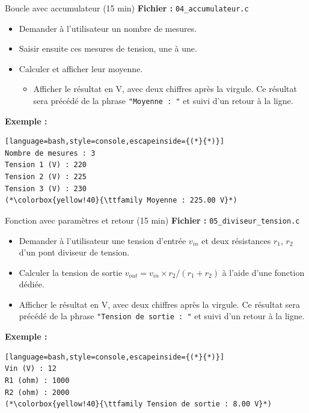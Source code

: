 \begin{UPSTIexercice}{Boucle avec accumulateur (15 min)}
  \textbf{Fichier :} \texttt{04\_accumulateur.c}
  \begin{itemize}
    \item Demander à l'utilisateur un nombre de mesures.
    \item Saisir ensuite ces mesures de tension, une à une.
    \item Calculer et afficher leur moyenne.
    \begin{itemize}
      \item Afficher le résultat en V, avec deux chiffres après la virgule. Ce résultat sera précédé de la phrase \texttt{"Moyenne : "} et suivi d'un retour à la ligne.
    \end{itemize}
  \end{itemize}

  \textbf{Exemple :}
  \begin{lstlisting}[language=bash,style=console,escapeinside={(*}{*)}]
Nombre de mesures : 3
Tension 1 (V) : 220
Tension 2 (V) : 225
Tension 3 (V) : 230
(*\colorbox{yellow!40}{\ttfamily Moyenne : 225.00 V}*)
  \end{lstlisting}
\end{UPSTIexercice}

\begin{UPSTIexercice}{Fonction avec paramètres et retour (15 min)}
  \textbf{Fichier :} \texttt{05\_diviseur\_tension.c}
  \begin{itemize}
    \item Demander à l'utilisateur une tension d'entrée $v_{in}$ et deux résistances $r_1$, $r_2$ d'un pont diviseur de tension.
    \item Calculer la tension de sortie $v_{out} = v_{in} \times r_2 / (r_1 + r_2)$ à l'aide d'une fonction dédiée.
    \item Afficher le résultat en V, avec deux chiffres après la virgule. Ce résultat sera précédé de la phrase \texttt{"Tension de sortie : "} et suivi d'un retour à la ligne.
  \end{itemize}

  \textbf{Exemple :}
  \begin{lstlisting}[language=bash,style=console,escapeinside={(*}{*)}]
Vin (V) : 12
R1 (ohm) : 1000
R2 (ohm) : 2000
(*\colorbox{yellow!40}{\ttfamily Tension de sortie : 8.00 V}*)
  \end{lstlisting}
\end{UPSTIexercice}

